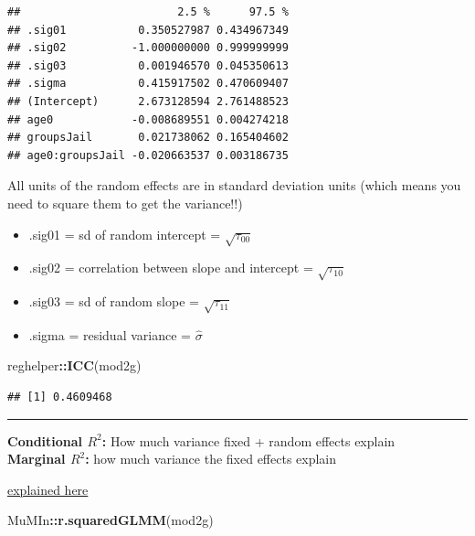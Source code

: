 \documentclass[]{article}
\newenvironment{Shaded}{\begin{snugshade}}{\end{snugshade}}
\newcommand{\KeywordTok}[1]{\textcolor[rgb]{0.13,0.29,0.53}{\textbf{#1}}}
\newcommand{\OperatorTok}[1]{\textcolor[rgb]{0.81,0.36,0.00}{\textbf{#1}}}
\newcommand{\NormalTok}[1]{#1}
\begin{document}
\begin{verbatim}
##                        2.5 %      97.5 %
## .sig01           0.350527987 0.434967349
## .sig02          -1.000000000 0.999999999
## .sig03           0.001946570 0.045350613
## .sigma           0.415917502 0.470609407
## (Intercept)      2.673128594 2.761488523
## age0            -0.008689551 0.004274218
## groupsJail       0.021738062 0.165404602
## age0:groupsJail -0.020663537 0.003186735
\end{verbatim}

All units of the random effects are in standard deviation units (which
means you need to square them to get the variance!!)\\

\begin{itemize}
  \item .sig01 = sd of random intercept = $\sqrt{\tau_{00}}$  
  \item .sig02 = correlation between slope and intercept = $\sqrt{\tau_{10}}$  
  \item .sig03 = sd of random slope = $\sqrt{\tau_{11}}$  
  \item .sigma = residual variance = $\hat{\sigma}$  
\end{itemize}

\small

\begin{Shaded}
\begin{Highlighting}[]
\NormalTok{reghelper}\OperatorTok{::}\KeywordTok{ICC}\NormalTok{(mod2g)}
\end{Highlighting}
\end{Shaded}

\begin{verbatim}
## [1] 0.4609468
\end{verbatim}

\begin{center}\rule{0.5\linewidth}{\linethickness}\end{center}

\small
\textbf{Conditional $R^2$:} How much variance fixed + random effects
explain\\
\textbf{Marginal $R^2$:} how much variance the fixed effects explain

\href{https://jonlefcheck.net/2013/03/13/r2-for-linear-mixed-effects-models/}{explained
here}

\begin{Shaded}
\begin{Highlighting}[]
\NormalTok{MuMIn}\OperatorTok{::}\KeywordTok{r.squaredGLMM}\NormalTok{(mod2g)}
\end{Highlighting}
\end{Shaded}
\end{document}
